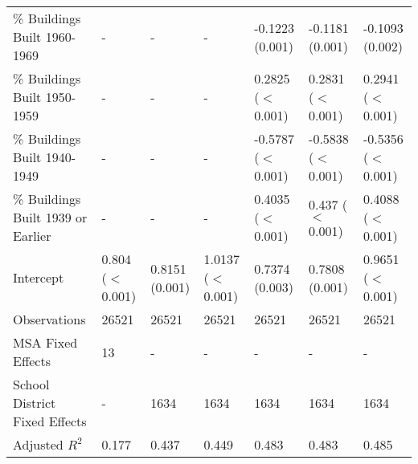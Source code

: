 \begin{table}[h]
\begin{tabular}{l|llllll}
\% Buildings Built 1960-1969 &- & - & - & -0.1223 (0.001) & -0.1181 (0.001) & -0.1093 (0.002) \\
\% Buildings Built 1950-1959 &- & - & - & 0.2825 ($<$0.001) & 0.2831 ($<$0.001) & 0.2941 ($<$0.001) \\
\% Buildings Built 1940-1949 &- & - & - & -0.5787 ($<$0.001) & -0.5838 ($<$0.001) & -0.5356 ($<$0.001) \\
\% Buildings Built 1939 or Earlier &- & - & - & 0.4035 ($<$0.001) & 0.437 ($<$0.001) & 0.4088 ($<$0.001) \\
Intercept &0.804 ($<$0.001) & 0.8151 (0.001) & 1.0137 ($<$0.001) & 0.7374 (0.003) & 0.7808 (0.001) & 0.9651 ($<$0.001) \\
Observations &26521 & 26521 & 26521 & 26521 & 26521 & 26521 \\
MSA Fixed Effects &13 & - & - & - & - & - \\
School District Fixed Effects &- & 1634 & 1634 & 1634 & 1634 & 1634 \\
Adjusted $R^2$ &0.177 & 0.437 & 0.449 & 0.483 & 0.483 & 0.485 \\\hline
\end{tabular}
\end{table}

